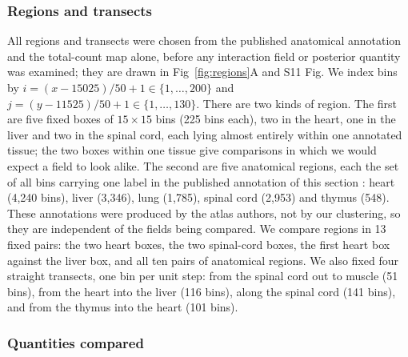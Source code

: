 \documentclass[10pt,letterpaper]{article}
\begin{document}
\subsubsection*{Regions and transects}

All regions and transects were chosen from the published anatomical annotation and the total-count map alone, before any interaction field or posterior quantity was examined; they are drawn in Fig~\ref{fig:regions}A and S11 Fig. We index bins by $i = (x - 15025)/50 + 1 \in \{1,\dots,200\}$ and $j = (y - 11525)/50 + 1 \in \{1,\dots,130\}$. There are two kinds of region. The first are five fixed boxes of $15 \times 15$ bins (225 bins each), two in the heart, one in the liver and two in the spinal cord, each lying almost entirely within one annotated tissue; the two boxes within one tissue give comparisons in which we would expect a field to look alike. The second are five anatomical regions, each the set of all bins carrying one label in the published annotation of this section \cite{Chen2022}: heart (4,240 bins), liver (3,346), lung (1,785), spinal cord (2,953) and thymus (548). These annotations were produced by the atlas authors, not by our clustering, so they are independent of the fields being compared. We compare regions in 13 fixed pairs: the two heart boxes, the two spinal-cord boxes, the first heart box against the liver box, and all ten pairs of anatomical regions. We also fixed four straight transects, one bin per unit step: from the spinal cord out to muscle (51 bins), from the heart into the liver (116 bins), along the spinal cord (141 bins), and from the thymus into the heart (101 bins).

\subsubsection*{Quantities compared}
\end{document}
